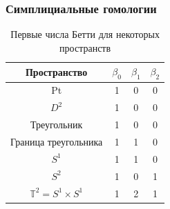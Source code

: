 \documentclass{beamer}
\begin{document}
		\begin{frame}
			\frametitle{Симплициальные гомологии}
			\begin{center}
				\begin{table}[!htbp]
					\centering
					\begin{tabular}{ |c|c c c| }
						\hline
						Пространство & $\beta_0$ & $\beta_1$ & $\beta_2$ \\ 
						\hline
						Pt & 1 & 0 & 0 \\ 
						$D^2$ & 1 & 0 & 0 \\ 
						Треугольник & 1 & 0 & 0 \\
						Граница треугольника & 1 & 1 & 0 \\
						$S^1$ & 1 & 1 & 0 \\
						$S^2$ & 1 & 0 & 1 \\
						$\mathbb{T}^2 = S^1 \times S^1$ & 1 & 2 & 1 \\
						\hline
					\end{tabular}
					\caption{Первые числа Бетти для некоторых пространств}
				\end{table}
			\end{center}
		\end{frame}
\end{document}
